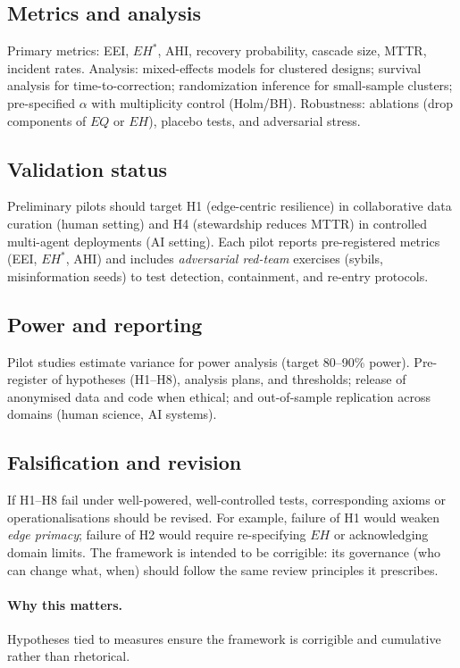 \documentclass[12pt]{article}
\begin{document}
\subsection{Metrics and analysis}
Primary metrics: EEI, $EH^{\ast}$, AHI, recovery probability, cascade size, MTTR, incident rates. Analysis: mixed-effects models for clustered designs; survival analysis for time-to-correction; randomization inference for small-sample clusters; pre-specified $\alpha$ with multiplicity control (Holm/BH). Robustness: ablations (drop components of $EQ$ or $EH$), placebo tests, and adversarial stress.


\subsection{Validation status}
Preliminary pilots should target H1 (edge-centric resilience) in collaborative data curation (human setting) and H4 (stewardship reduces MTTR) in controlled multi-agent deployments (AI setting). Each pilot reports pre-registered metrics (EEI, $EH^{\ast}$, AHI) and includes \emph{adversarial red-team} exercises (sybils, misinformation seeds) to test detection, containment, and re-entry protocols.
\subsection{Power and reporting}
Pilot studies estimate variance for power analysis (target 80--90\% power). Pre-register of hypotheses (H1--H8), analysis plans, and thresholds; release of anonymised data and code when ethical; and out-of-sample replication across domains (human science, AI systems).

\subsection{Falsification and revision}
If H1--H8 fail under well-powered, well-controlled tests, corresponding axioms or operationalisations should be revised. For example, failure of H1 would weaken \emph{edge primacy}; failure of H2 would require re-specifying $EH$ or acknowledging domain limits. The framework is intended to be corrigible: its governance (who can change what, when) should follow the same review principles it prescribes.

\paragraph{Why this matters.} Hypotheses tied to measures ensure the framework is corrigible and cumulative rather than rhetorical.
\end{document}
